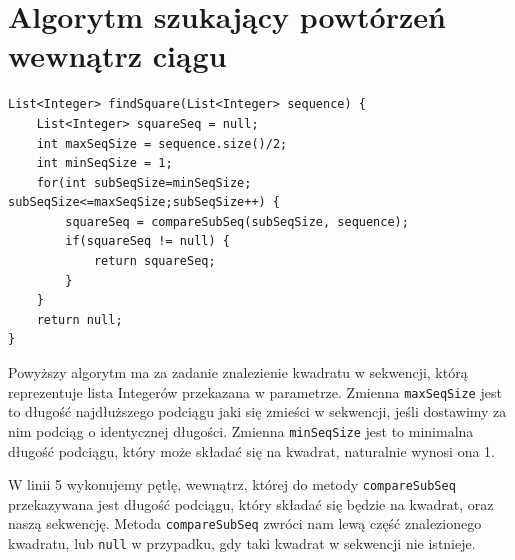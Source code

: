 \documentclass[document]{xmgr}
\begin{document}
\section{Algorytm szukający powtórzeń wewnątrz ciągu}






\begin{lstlisting}[frame=single]
List<Integer> findSquare(List<Integer> sequence) {
	List<Integer> squareSeq = null;
	int maxSeqSize = sequence.size()/2;
	int minSeqSize = 1;
	for(int subSeqSize=minSeqSize; subSeqSize<=maxSeqSize;subSeqSize++) {
		squareSeq = compareSubSeq(subSeqSize, sequence);
		if(squareSeq != null) {
			return squareSeq;
		}
	}
	return null;
}
\end{lstlisting}

Powyższy algorytm ma za zadanie znalezienie kwadratu w sekwencji, którą reprezentuje lista Integerów przekazana w parametrze. Zmienna \texttt{maxSeqSize} jest to długość najdłuższego podciągu jaki się zmieści w sekwencji, jeśli dostawimy za nim podciąg o identycznej długości. Zmienna \texttt{minSeqSize} jest to minimalna długość podciągu, który może składać się na kwadrat, naturalnie wynosi ona 1. 

W linii 5 wykonujemy pętlę, wewnątrz, której do metody \texttt{compareSubSeq} przekazywana jest długość podciągu, który składać się będzie na kwadrat, oraz naszą sekwencję. Metoda \texttt{compareSubSeq} zwróci nam lewą część znalezionego kwadratu, lub \texttt{null} w przypadku, gdy taki kwadrat w sekwencji nie istnieje.
\end{document}
